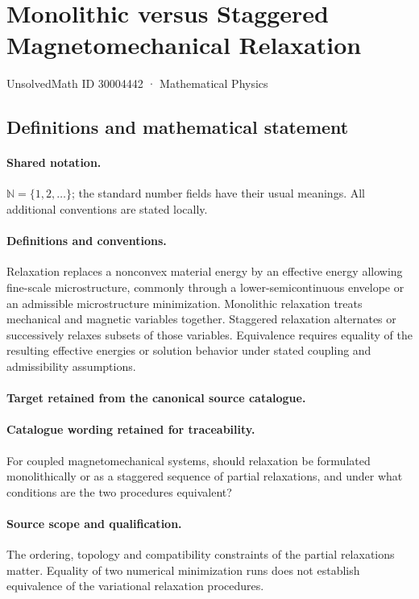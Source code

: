 \documentclass[11pt]{article}
\begin{document}
\setcounter{section}{30004441}
\section{Monolithic versus Staggered Magnetomechanical Relaxation}\label{30004442}
{\small UnsolvedMath ID 30004442 · Mathematical Physics}
\subsection{Definitions and mathematical statement}

\paragraph{Shared notation.}$\mathbb N=\{1,2,\ldots\}$; the standard number fields have their usual meanings. All additional conventions are stated locally.


\paragraph{Definitions and conventions.}
Relaxation replaces a nonconvex material energy by an effective energy allowing fine-scale microstructure, commonly through a lower-semicontinuous envelope or an admissible microstructure minimization. Monolithic relaxation treats mechanical and magnetic variables together. Staggered relaxation alternates or successively relaxes subsets of those variables. Equivalence requires equality of the resulting effective energies or solution behavior under stated coupling and admissibility assumptions.

\paragraph{Target retained from the canonical source catalogue.}
\paragraph{Catalogue wording retained for traceability.}
For coupled magnetomechanical systems, should relaxation be formulated monolithically or as a staggered sequence of partial relaxations, and under what conditions are the two procedures equivalent?

\paragraph{Source scope and qualification.}
The ordering, topology and compatibility constraints of the partial relaxations matter. Equality of two numerical minimization runs does not establish equivalence of the variational relaxation procedures.
\end{document}
